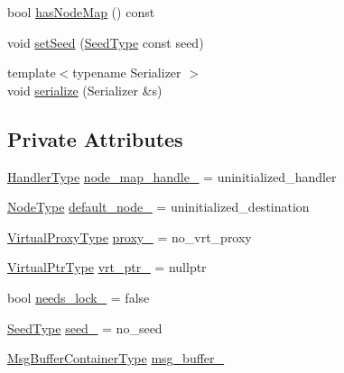 \begin{DoxyCompactItemize}
\item 
bool \hyperlink{structvt_1_1vrt_1_1_virtual_info_ae5153180aa0fdc89268929e9fa334692}{has\+Node\+Map} () const
\item 
void \hyperlink{structvt_1_1vrt_1_1_virtual_info_a5c90fa0c4f42e6e80552a66403137d3f}{set\+Seed} (\hyperlink{namespacevt_ae2e13198bdef4d5b8e603d6c1c7f0969}{Seed\+Type} const seed)
\item 
{\footnotesize template$<$typename Serializer $>$ }\\void \hyperlink{structvt_1_1vrt_1_1_virtual_info_a349b34bb7edcc5f915abed7358630374}{serialize} (Serializer \&s)
\end{DoxyCompactItemize}
\subsection*{Private Attributes}
\begin{DoxyCompactItemize}
\item 
\hyperlink{namespacevt_af64846b57dfcaf104da3ef6967917573}{Handler\+Type} \hyperlink{structvt_1_1vrt_1_1_virtual_info_aff33eb14fb253110c9e1e11d85061187}{node\+\_\+map\+\_\+handle\+\_\+} = uninitialized\+\_\+handler
\item 
\hyperlink{namespacevt_a866da9d0efc19c0a1ce79e9e492f47e2}{Node\+Type} \hyperlink{structvt_1_1vrt_1_1_virtual_info_aab9e25f18e560b403b3f62ebea9f8233}{default\+\_\+node\+\_\+} = uninitialized\+\_\+destination
\item 
\hyperlink{namespacevt_a1b417dd5d684f045bb58a0ede70045ac}{Virtual\+Proxy\+Type} \hyperlink{structvt_1_1vrt_1_1_virtual_info_a21017982fd772d1ac2afc6aa7f5959dc}{proxy\+\_\+} = no\+\_\+vrt\+\_\+proxy
\item 
\hyperlink{structvt_1_1vrt_1_1_virtual_info_aede28e76785423dd2685fe4cf54afa21}{Virtual\+Ptr\+Type} \hyperlink{structvt_1_1vrt_1_1_virtual_info_ab8a5fcddd4869b90ec10c243efc8d1f4}{vrt\+\_\+ptr\+\_\+} = nullptr
\item 
bool \hyperlink{structvt_1_1vrt_1_1_virtual_info_a809cb8200de743c2ff7970baa50f99ee}{needs\+\_\+lock\+\_\+} = false
\item 
\hyperlink{namespacevt_ae2e13198bdef4d5b8e603d6c1c7f0969}{Seed\+Type} \hyperlink{structvt_1_1vrt_1_1_virtual_info_aaecc2238b249b5a4a91af1e467fc1d44}{seed\+\_\+} = no\+\_\+seed
\item 
\hyperlink{structvt_1_1vrt_1_1_virtual_info_a58e94aae79e1e8f0bb4c2bf6c7ba608e}{Msg\+Buffer\+Container\+Type} \hyperlink{structvt_1_1vrt_1_1_virtual_info_ad8c0bf11f1dceb5891d08e3aaf6a2d95}{msg\+\_\+buffer\+\_\+}
\end{DoxyCompactItemize}
